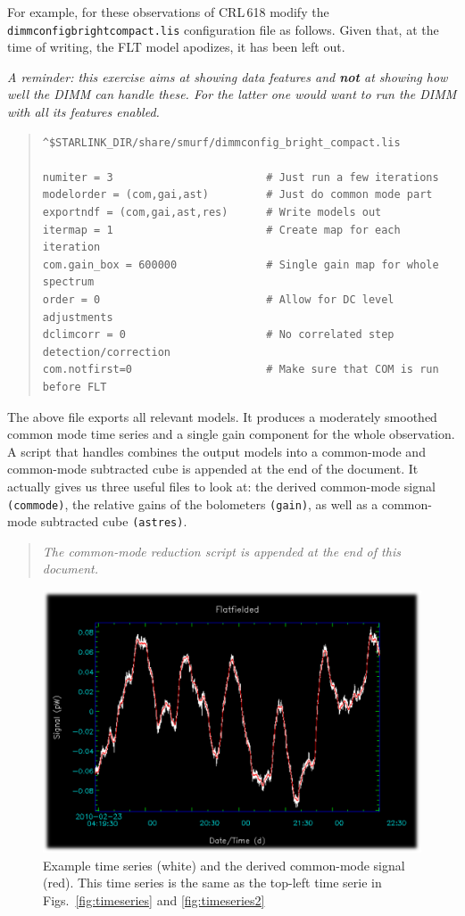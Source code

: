 \documentclass[twoside,11pt]{article}
\renewcommand{\_}{\texttt{\symbol{95}}}
\newenvironment{myquote}{\begin{quote}\begin{small}}{\end{small}\end{quote}}
\begin{document}
For example, for these observations of CRL\,618 modify the
\texttt{dimmconfig\_bright\_compact.lis} configuration file as
follows. Given that, at the time of writing, the FLT model apodizes,
it has been left out.

\emph{A reminder: this exercise aims at showing data features and
\textbf{not} at showing how well the DIMM can handle these. For the
latter one would want to run the DIMM with all its features
enabled.}

\begin{myquote}
\begin{verbatim}
^$STARLINK_DIR/share/smurf/dimmconfig_bright_compact.lis

numiter = 3                        # Just run a few iterations
modelorder = (com,gai,ast)         # Just do common mode part
exportndf = (com,gai,ast,res)      # Write models out
itermap = 1                        # Create map for each iteration
com.gain_box = 600000              # Single gain map for whole spectrum
order = 0                          # Allow for DC level adjustments
dclimcorr = 0                      # No correlated step detection/correction
com.notfirst=0                     # Make sure that COM is run before FLT
\end{verbatim}
\end{myquote}

The above file exports all relevant models. It produces a moderately
smoothed common mode time series and a single gain component for the
whole observation. A script that handles combines the output models
into a common-mode and common-mode subtracted cube is appended at the
end of the document. It actually gives us three useful files to look
at: the derived common-mode signal \texttt{(\_commode)}, the relative
gains of the bolometers \texttt{(\_gain)}, as well as a common-mode
subtracted cube \texttt{(\_astres)}.

\begin{myquote}
\textsl{The common-mode reduction script is appended at the end of this document.}
\end{myquote}

\begin{figure}[ht]
\begin{center}
\includegraphics[width=0.45\linewidth]{sc19_dimm_common_mode}
\caption{Example time series (white) and the derived
common-mode signal (red).  This time series is the same as the
top-left time serie in Figs.~\ref{fig:timeseries} and \ref{fig:timeseries2}}
\label{fig:dimmcommonmode}
\end{center}
\end{figure}
\end{document}

